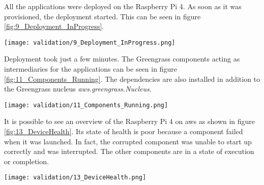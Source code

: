 All the applications were deployed on the Raspberry Pi 4. As soon as it was provisioned, the deployment started. This can be seen in figure \ref{fig:9_Deployment_InProgress}.
\begin{center}
    \begingroup
    \texttt{[image: validation/9\_Deployment\_InProgress.png]}
    \label{fig:9_Deployment_InProgress}
    \endgroup
\end{center}
Deployment took just a few minutes. The Greengrass components acting as intermediaries for the applications can be seen in figure \ref{fig:11_Components_Running}. The dependencies are also installed in addition to the Greengrass nucleus \textit{aws.greengrass.Nucleus}.
\begin{center}
    \begingroup
    \texttt{[image: validation/11\_Components\_Running.png]}
    \label{fig:11_Components_Running}
    \endgroup
\end{center}
It is possible to see an overview of the Raspberry Pi 4 on \gls{aws} as shown in figure \ref{fig:13_DeviceHealth}. Its state of health is poor because a component failed when it was launched. In fact, the corrupted component was unable to start up correctly and was interrupted. The other components are in a state of execution or completion.
\begin{center}
    \begingroup
    \texttt{[image: validation/13\_DeviceHealth.png]}
    \label{fig:13_DeviceHealth}
    \endgroup
\end{center}

